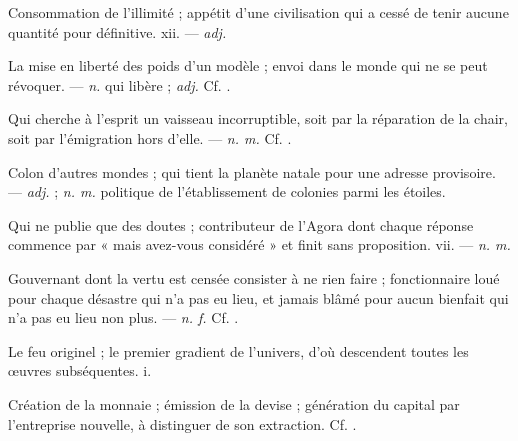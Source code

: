  Consommation de l'illimité ; appétit d'une civilisation qui a cessé de tenir aucune quantité pour définitive.   xii. ---  \textit{adj.}

 La mise en liberté des poids d'un modèle ; envoi dans le monde qui ne se peut révoquer.   ---  \textit{n.} qui libère ;  \textit{adj.} Cf. .

 Qui cherche à l'esprit un vaisseau incorruptible, soit par la réparation de la chair, soit par l'émigration hors d'elle. ---  \textit{n. m.} Cf. .

 Colon d'autres mondes ; qui tient la planète natale pour une adresse provisoire. ---  \textit{adj.} ;  \textit{n. m.} politique de l'établissement de colonies parmi les étoiles.

 Qui ne publie que des doutes ; contributeur de l'Agora dont chaque réponse commence par « mais avez-vous considéré » et finit sans proposition.   vii. ---  \textit{n. m.}

 Gouvernant dont la vertu est censée consister à ne rien faire ; fonctionnaire loué pour chaque désastre qui n'a pas eu lieu, et jamais blâmé pour aucun bienfait qui n'a pas eu lieu non plus. ---  \textit{n. f.} Cf. .

 Le feu originel ; le premier gradient de l'univers, d'où descendent toutes les œuvres subséquentes.   i.

 Création de la monnaie ;  émission de la devise ;   génération du capital par l'entreprise nouvelle, à distinguer de son extraction. Cf. .


